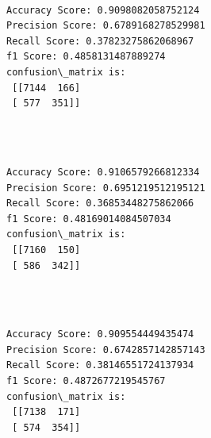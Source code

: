 \documentclass[11pt]{article}
\begin{document}
   

    \begin{center}
    \end{center}
    { \hspace*{\fill} \\}
    
 

    \begin{Verbatim}[commandchars=\\\{\}]
Accuracy Score: 0.9098082058752124
Precision Score: 0.6789168278529981
Recall Score: 0.37823275862068967
f1 Score: 0.4858131487889274
confusion\_matrix is: 
 [[7144  166]
 [ 577  351]] 


    \end{Verbatim}

   

    \begin{center}
    \end{center}
    { \hspace*{\fill} \\}
    
    

    \begin{Verbatim}[commandchars=\\\{\}]
Accuracy Score: 0.9106579266812334
Precision Score: 0.6951219512195121
Recall Score: 0.36853448275862066
f1 Score: 0.48169014084507034
confusion\_matrix is: 
 [[7160  150]
 [ 586  342]] 


    \end{Verbatim}


    \begin{center}
    \end{center}
    { \hspace*{\fill} \\}
    
   

    \begin{Verbatim}[commandchars=\\\{\}]
Accuracy Score: 0.909554449435474
Precision Score: 0.6742857142857143
Recall Score: 0.38146551724137934
f1 Score: 0.4872677219545767
confusion\_matrix is: 
 [[7138  171]
 [ 574  354]] 


    \end{Verbatim}
\end{document}
